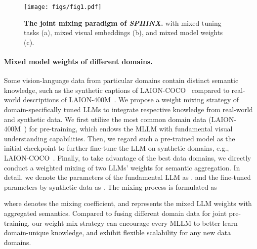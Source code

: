 \documentclass{article} \usepackage{iclr2024_conference,times}
\begin{document}
\begin{figure*}[t!]
  \centering
\texttt{[image: figs/fig1.pdf]}
   \caption{\textbf{The joint mixing paradigm of \textcolor{Goldenrod3}{\textbf{\textit{SPHINX}}}.} with mixed tuning tasks (a), mixed visual embeddings (b), and mixed model weights (c).}
    \label{fig1}
\end{figure*}

\paragraph{Mixed model weights of different domains.}
Some vision-language data from particular domains contain distinct semantic knowledge, such as the synthetic captions of LAION-COCO~\citep{laioncoco} compared to real-world descriptions of LAION-400M~\citep{schuhmann2021laion}. We propose a weight mixing strategy of domain-specifically tuned LLMs to integrate respective knowledge from real-world and synthetic data.
We first utilize the most common domain data (LAION-400M~\citep{schuhmann2021laion}) for pre-training, which endows the MLLM with fundamental visual understanding capabilities. Then, we regard such a pre-trained model as the initial checkpoint to further fine-tune the LLM on synthetic domains, e.g., LAION-COCO~\citep{laioncoco}. Finally, to take advantage of the best data domains, we directly conduct a weighted mixing of two LLMs' weights for semantic aggregation.
In detail, we denote the parameters of the fundamental LLM as , and the fine-tuned parameters by synthetic data as . The mixing process is formulated as

where  denotes the mixing coefficient, and  represents the mixed LLM weights with aggregated semantics. 
Compared to fusing different domain data for joint pre-training, our weight mix strategy can encourage every MLLM to better learn domain-unique knowledge, and exhibit flexible scalability for any new data domains.
\end{document}
